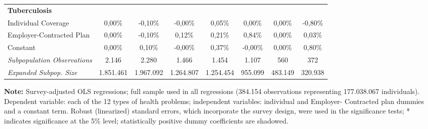 \documentclass{article}
\begin{document}
\begin{table*}
{\begin{tabular}{l*{7}{c}}
\midrule
\textbf{Tuberculosis} & & & & & & & \\

Individual Coverage      &   0,00\%         &  -0,10\%         &  -0,00\%         &   0,05\%         &   0,00\%         &   0,00\%         &  -0,80\%         \\
Employer-Contracted Plan &   0,00\%         &  -0,10\%         &   0,12\%         &   0,21\%         &   0,84\%\sym{*}  &   0,00\%         &   0,03\%         \\
Constant                 &   0,00\%         &   0,10\%         &  -0,00\%         &   0,37\%         &  -0,00\%         &   0,00\%         &   0,80\%         \\

\midrule

\textit{Subpopulation Observations} 	& 2.146 & 2.280 & 1.466 & 1.454 & 1.107 & 560 & 372         \\
\textit{Expanded Subpop. Size} 		& 1.851.461 & 1.967.092 & 1.264.807 & 1.254.454 & 955.099 & 483.149 & 320.938      \\

	\hline \hline

\end{tabular}}

\justify \small {} \textbf{Note:} Survey-adjusted OLS regressions; full sample used in all regressions (384.154 observations representing 177.038.067
individuals). Dependent variable: each of the 12 types of health problems; independent variables: individual and Employer-
Contracted plan dummies and a constant term. Robust (linearized) standard errors, which incorporate the survey design, were
used in the significance tests; * indicates significance at the 5\% level; statistically positive dummy coefficients are shadowed.

\end{table*}













\newpage
\end{document}
